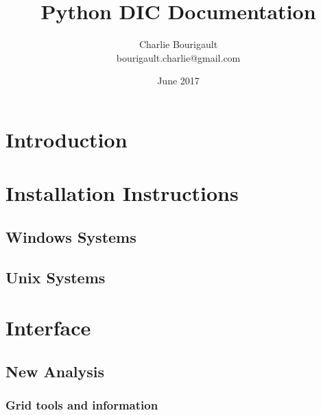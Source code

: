 \documentclass{article}
\begin{document}
\title{Python DIC Documentation}
\author{Charlie Bourigault\\ bourigault.charlie@gmail.com}
\date{June 2017}
\maketitle
\thispagestyle{empty}
\begin{abstract}
  
\end{abstract}
\newpage
\tableofcontents


\newpage
\section*{Introduction}
\label{sec:Introduction}
\vspace{.5cm}


\newpage
\section{Installation Instructions}
\label{sec:Installation Instructions}
\vspace{.5cm}


\subsection{Windows Systems}
\label{sub:Windows Systems}
  

\subsection{Unix Systems}
\label{sub:Unix Systems}
  

\newpage
\section{Interface}
\label{sec:Interface}
\vspace{.5cm}
  

  \subsection{New Analysis}
  \label{sub:New Analysis}
    

    \subsubsection{Grid tools and information}
    \label{subs:Grid Tools and Information}
      
\end{document}
